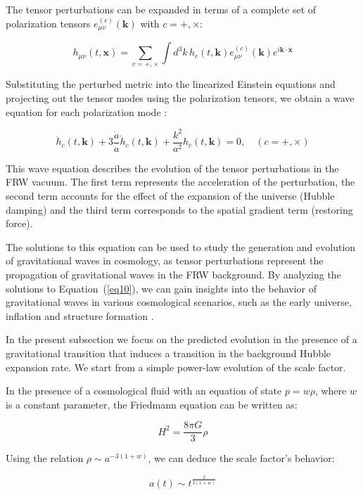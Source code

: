 \documentclass[universe,article,accept,moreauthors,pdftex]{Definitions/mdpi}
\newcommand{\be}{\begin{equation}}
\newcommand{\ee}{\end{equation}}
\begin{document}
The tensor perturbations can be expanded in terms of a complete set of polarization tensors $e_{\mu\nu}^{(c)}(\mathbf{k})$ with $c = +, \times$:

\be 
h_{\mu\nu}(t, \mathbf{x}) = \sum_{c = +, \times} \int d^{3}k \, h_{c}(t, \mathbf{k}) e_{\mu\nu}^{(c)}(\mathbf{k}) e^{i\mathbf{k} \cdot \mathbf{x}}
\ee

Substituting the perturbed metric into the linearized Einstein equations and projecting out the tensor modes using the polarization tensors, we obtain a wave equation for each polarization mode \cite{dodelson2020modern}:

\be
\ddot{h}_{c}(t, \mathbf{k}) + 3 \frac{\dot{a}}{a} \dot{h}_{c}(t, \mathbf{k}) + \frac{k^2}{a^2} h_{c}(t, \mathbf{k}) = 0, \quad (c = +, \times)
\label{eq10}
\ee

This wave equation describes the evolution of the tensor perturbations in the FRW vacuum. The first term represents the acceleration of the perturbation, the second term accounts for the effect of the expansion of the universe (Hubble damping) and the third term corresponds to the spatial gradient term (restoring force).

The solutions to this equation can be used to study the generation and evolution of gravitational waves in cosmology, as tensor perturbations represent the propagation of gravitational waves in the FRW background. By analyzing the solutions to \mbox{Equation (\ref{eq10}),} we can gain insights into the behavior of gravitational waves in various cosmological scenarios, such as the early universe, inflation and structure formation \cite{dodelson2020modern}.

In the present subsection we focus on the predicted evolution in the presence of a gravitational transition that induces a transition in the background Hubble expansion rate. We start from a simple power-law evolution of the scale factor.

In the presence of a cosmological fluid with an equation of state $p = w\rho$, where $w$ is a constant parameter, the Friedmann equation can be written as:

\begin{equation}
H^2 = \frac{8 \pi G}{3} \rho
\end{equation}

Using the relation $\rho \sim a^{-3(1+w)}$, we can deduce the scale factor's behavior:

\begin{equation}
a(t) \sim t^{\frac{2}{3(1+w)}}
\end{equation}
\end{document}
